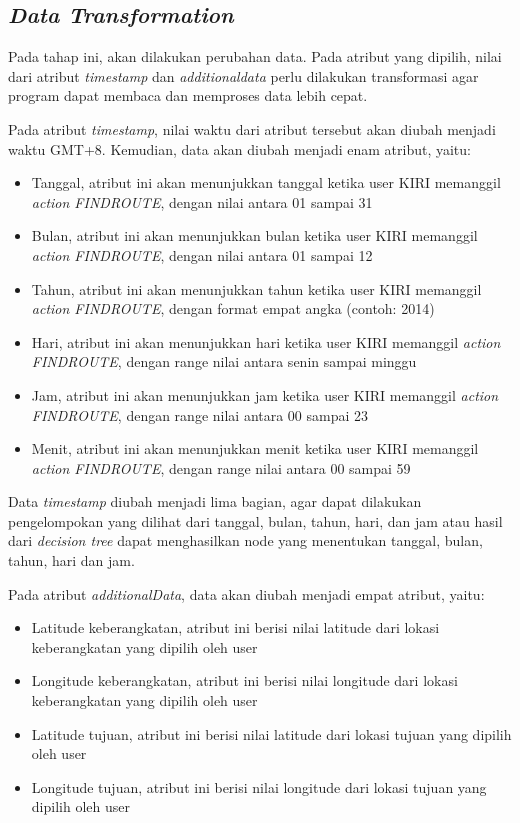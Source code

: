 \subsection{\textsl{Data Transformation}}
Pada tahap ini, akan dilakukan perubahan data. Pada atribut yang dipilih, nilai dari atribut \textsl{timestamp} dan \textsl{additionaldata} perlu dilakukan transformasi agar program dapat membaca dan memproses data lebih cepat. 

Pada atribut \textsl{timestamp}, nilai waktu dari atribut tersebut akan diubah menjadi waktu GMT+8. Kemudian, data akan diubah menjadi enam atribut, yaitu:
\begin{itemize}
	\item Tanggal, atribut ini akan menunjukkan tanggal ketika user KIRI memanggil \textsl{action FINDROUTE}, dengan nilai antara 01 sampai 31
	\item Bulan, atribut ini akan menunjukkan bulan ketika user KIRI memanggil \textsl{action FINDROUTE}, dengan nilai antara 01 sampai 12 
	\item Tahun, atribut ini akan menunjukkan tahun ketika user KIRI memanggil \textsl{action FINDROUTE}, dengan format empat angka (contoh: 2014)
	\item Hari, atribut ini akan menunjukkan hari ketika user KIRI memanggil \textsl{action FINDROUTE}, dengan range nilai antara senin sampai minggu
	\item Jam, atribut ini akan menunjukkan jam ketika user KIRI memanggil \textsl{action FINDROUTE}, dengan range nilai antara 00 sampai 23
	\item Menit, atribut ini akan menunjukkan menit ketika user KIRI memanggil \textsl{action FINDROUTE}, dengan range nilai antara 00 sampai 59
\end{itemize}

Data \textsl{timestamp} diubah menjadi lima bagian, agar dapat dilakukan pengelompokan yang dilihat dari tanggal, bulan, tahun, hari, dan jam atau hasil dari \textsl{decision tree} dapat menghasilkan node yang menentukan tanggal, bulan, tahun, hari dan jam.

Pada atribut \textsl{additionalData}, data akan diubah menjadi empat atribut, yaitu:
\begin{itemize}
	\item Latitude keberangkatan, atribut ini berisi nilai latitude dari lokasi keberangkatan yang dipilih oleh user
	\item Longitude keberangkatan, atribut ini berisi nilai longitude dari lokasi keberangkatan yang dipilih oleh user
	\item Latitude tujuan, atribut ini berisi nilai latitude dari lokasi tujuan yang dipilih oleh user
	\item Longitude tujuan, atribut ini berisi nilai longitude dari lokasi tujuan yang dipilih oleh user
\end{itemize}

